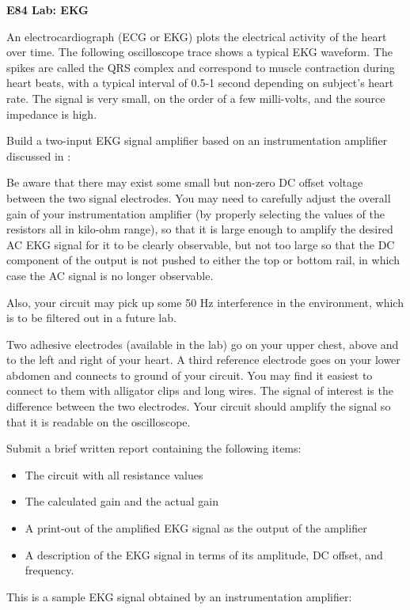 \documentclass{article}
\begin{document}
{\Large \bf E84 Lab: EKG}


An electrocardiograph (ECG or EKG) plots the electrical 
activity of the heart over time. The following oscilloscope
trace shows a typical EKG waveform. The spikes are called the
QRS complex and correspond to muscle contraction during heart
beats, with a typical interval of 0.5-1 second depending on 
subject's heart rate. The signal is very small, on the order 
of a few milli-volts, and the source impedance is high.

Build a two-input EKG signal amplifier based on an instrumentation
amplifier discussed in
:


Be aware that there may exist some small but non-zero DC offset 
voltage between the two signal electrodes. You may need to 
carefully adjust the overall gain of your instrumentation 
amplifier (by properly selecting the values of the resistors 
all in kilo-ohm range), so that it is large enough to amplify 
the desired AC EKG signal for it to be clearly observable, but
not too large so that the DC component of the output is not 
pushed to either the top or bottom rail, in which case the AC 
signal is no longer observable.

Also, your circuit may pick up some 50 Hz interference in the 
environment, which is to be filtered out in a future lab.

Two adhesive electrodes (available in the lab) go on your upper 
chest, above and to the left and right of your heart. A third 
reference electrode goes on your lower abdomen and connects to 
ground of your circuit. You may find it easiest to connect to
them with alligator clips and long wires. The signal of interest
is the difference between the two electrodes. Your circuit should
amplify the signal so that it is readable on the oscilloscope.

Submit a brief written report containing the following items:
\begin{itemize}
\item The circuit with all resistance values
\item The calculated gain and the actual gain
\item A print-out of the amplified EKG signal as the output of 
  the amplifier
\item A description of the EKG signal in terms of its amplitude, 
  DC offset, and frequency. 
\end{itemize}

This is a sample EKG signal obtained by an instrumentation 
amplifier:

\end{document}
